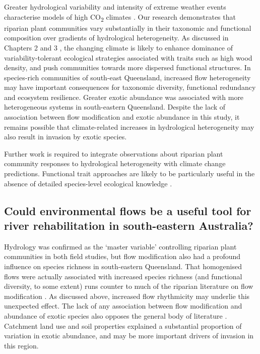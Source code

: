 \documentclass[openright,12pt,a4paper]{memoir}
\begin{document}
{{Greater hydrological variability and intensity of extreme weather events characterise models of high CO\textsubscript{2} climates \citep{Hennessy2008, stocker2013climate}. Our research demonstrates that riparian plant communities vary substantially in their taxonomic and functional composition over gradients of hydrological heterogeneity. As discussed in Chapters 2 and 3 \citep{Lawson2015, Lawson2015a}, the changing climate is likely to enhance dominance of variability-tolerant ecological strategies associated with traits such as high wood density, and push communities towards more dispersed functional structures. In species-rich communities of south-east Queensland, increased flow heterogeneity may have important consequences for taxonomic diversity, functional redundancy and ecosystem resilience. Greater exotic abundance was associated with more heterogeneous systems in south-eastern Queensland. Despite the lack of association between flow modification and exotic abundance in this study, it remains possible that climate-related increases in hydrological heterogeneity may also result in invasion by exotic species.

Further work is required to integrate observations about riparian plant community responses to hydrological heterogeneity with climate change predictions. Functional trait approaches are likely to be particularly useful in the absence of detailed species-level ecological knowledge \citep{Catford2012a}.

\subsection{Could environmental flows be a useful tool for river rehabilitation in south-eastern Australia?}
Hydrology was confirmed as the ‘master variable’ controlling riparian plant communities \citep{Poff1997} in both field studies, but flow modification also had a profound influence on species richness in south-eastern Queensland. That homogenised flows were actually associated with increased species richness (and functional diversity, to some extent) runs counter to much of the riparian literature on flow modification \citep{Nilsson2000, Lytle2004}. As discussed above, increased flow rhythmicity may underlie this unexpected effect. The lack of any association between flow modification and abundance of exotic species also opposes the general body of literature \citep{Catford2011, Greet2012}. Catchment land use and soil properties explained a substantial proportion of variation in exotic abundance, and may be more important drivers of invasion in this region.

}}
\end{document}
